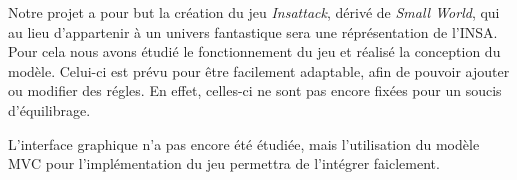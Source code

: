 Notre projet a pour but la création du jeu \emph{Insattack}, dérivé de \emph{Small World}, qui au lieu d'appartenir à un univers fantastique sera une réprésentation de l'INSA. Pour cela nous avons étudié le fonctionnement du jeu et réalisé la conception du modèle. Celui-ci est prévu pour être facilement adaptable, afin de pouvoir ajouter ou modifier des régles. En effet, celles-ci ne sont pas encore fixées pour un soucis d'équilibrage.

L'interface graphique n'a pas encore été étudiée, mais l'utilisation du modèle MVC pour l'implémentation du jeu permettra de l'intégrer faiclement.